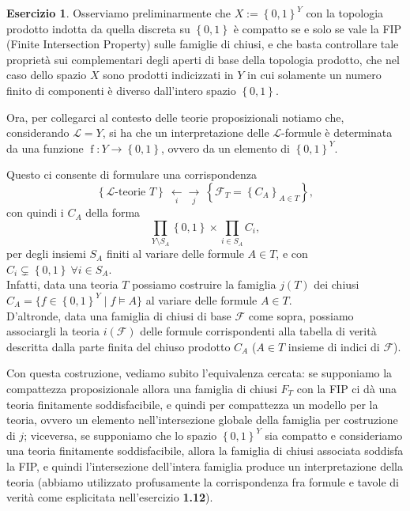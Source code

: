 \documentclass[a4paper]{article}
\theoremstyle{definition}
\theoremstyle{definition}
\theoremstyle{remark}
\theoremstyle{definition}
\newtheorem{exercise}{Esercizio}[section]
\begin{document}
\begin{exercise}
	Osserviamo preliminarmente che $X:=\left\{ 0,1 \right\} ^Y$ con la topologia prodotto indotta da quella discreta su $\left\{ 0,1 \right\} $ è compatto se e solo se vale la FIP (Finite Intersection Property) sulle famiglie di chiusi, e che basta controllare tale proprietà
	sui complementari degli aperti di base della topologia prodotto, che nel caso dello spazio $X$ sono prodotti indicizzati in $Y$ in cui solamente un numero finito di
	componenti è diverso
	dall'intero spazio $\left\{ 0,1 \right\}$.

	Ora, per collegarci al contesto delle teorie proposizionali notiamo che, considerando $\mathcal{L}=Y$, si ha che un interpretazione delle $\mathcal{L} $-formule è
	determinata da una funzione $\operatorname{f}: Y \to \left\{ 0,1 \right\}$, ovvero da un elemento di $\left\{ 0,1 \right\} ^Y$.

	Questo ci consente di formulare una corrispondenza $$\left\{\mathcal{L}\text{-teorie }T\right\}~\underset{i}{\leftarrow}\underset{j}{\rightarrow}~\left\{\mathcal{F}_T=\left\{ C_A \right\} _{A\in T}\right\},$$
	con quindi i $C_A$ della forma $$\prod_{Y\setminus S_A}{\left\{ 0,1 \right\} }\times\prod_{i\in S_A}{C_i},$$
	per degli insiemi $S_A$ finiti al variare delle formule $A\in T$, e con $C_i\subsetneq\left\{ 0,1 \right\}~\forall i\in S_A$.\\
	Infatti, data una teoria $T$ possiamo costruire la famiglia $j(T)$ dei chiusi $C_A=\{ f\in\left\{ 0,1 \right\}^Y\mid f\models A \}
	$ al variare delle formule $A \in T$.\\
	D'altronde, data una famiglia di chiusi di base $\mathcal{F}$ come sopra, possiamo associargli la teoria $i(\mathcal{F})$ delle formule corrispondenti alla tabella di
	verità descritta dalla parte finita del chiuso prodotto $C_A$ ($A\in T$ insieme di indici di $\mathcal{F}$).

	Con questa costruzione, vediamo subito l'equivalenza cercata: se supponiamo la compattezza proposizionale allora una famiglia di chiusi $F_T$ con la FIP ci dà una teoria finitamente
	soddisfacibile,	e quindi per compattezza un modello per la teoria, ovvero un elemento nell'intersezione globale della famiglia per costruzione di $j$; viceversa, se supponiamo che lo spazio
	$\left\{ 0,1 \right\}^Y$ sia compatto e consideriamo una teoria finitamente soddisfacibile, allora la famiglia di chiusi associata soddisfa la FIP, e quindi l'intersezione
	dell'intera famiglia produce un interpretazione
	della teoria (abbiamo utilizzato profusamente la corrispondenza fra formule e tavole di verità come esplicitata nell'esercizio \textbf{1.12}).
\end{exercise}
\end{document}

